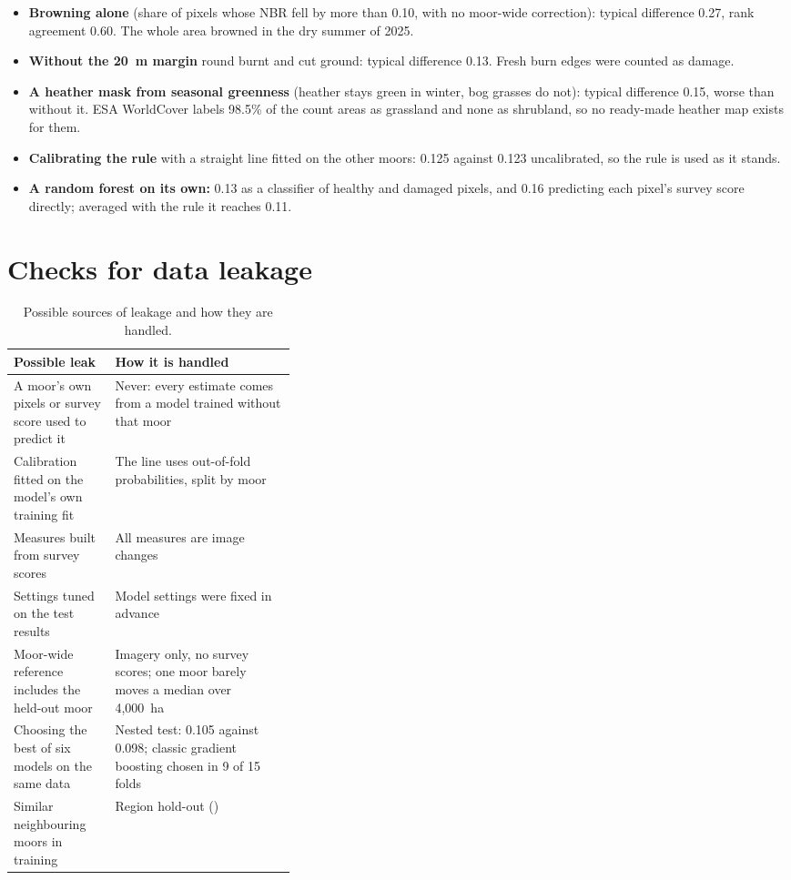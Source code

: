 \documentclass[11pt,a4paper]{article}
\begin{document}
\begin{itemize}
\item \textbf{Browning alone} (share of pixels whose NBR fell by more than 0.10, with no moor-wide correction): typical difference 0.27, rank agreement 0.60. The whole area browned in the dry summer of 2025.
\item \textbf{Without the 20~m margin} round burnt and cut ground: typical difference 0.13. Fresh burn edges were counted as damage.
\item \textbf{A heather mask from seasonal greenness} (heather stays green in winter, bog grasses do not): typical difference 0.15, worse than without it. ESA WorldCover labels 98.5\% of the count areas as grassland and none as shrubland, so no ready-made heather map exists for them.
\item \textbf{Calibrating the rule} with a straight line fitted on the other moors: 0.125 against 0.123 uncalibrated, so the rule is used as it stands.
\item \textbf{A random forest on its own:} 0.13 as a classifier of healthy and damaged pixels, and 0.16 predicting each pixel's survey score directly; averaged with the rule it reaches 0.11.
\end{itemize}

\section{Checks for data leakage}\label{app:leakage}

\begin{table}[H]
\centering
\caption{Possible sources of leakage and how they are handled.}\label{tab:leakage}
\footnotesize
\begin{tabularx}{\linewidth}{>{\raggedright\arraybackslash}p{0.36\linewidth}L}
\toprule
Possible leak & How it is handled \\
\midrule
A moor's own pixels or survey score used to predict it & Never: every estimate comes from a model trained without that moor \\
Calibration fitted on the model's own training fit & The line uses out-of-fold probabilities, split by moor \\
Measures built from survey scores & All measures are image changes \\
Settings tuned on the test results & Model settings were fixed in advance \\
Moor-wide reference includes the held-out moor & Imagery only, no survey scores; one moor barely moves a median over 4,000~ha \\
Choosing the best of six models on the same data & Nested test: 0.105 against 0.098; classic gradient boosting chosen in 9 of 15 folds \\
Similar neighbouring moors in training & Region hold-out () \\
\bottomrule
\end{tabularx}
\end{table}
\end{document}
